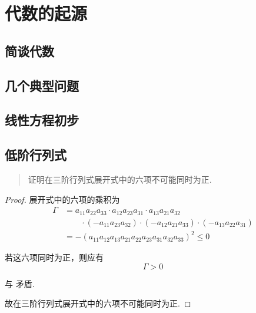 \cleardoublepage

\chapter{代数的起源}

\section{简谈代数}

\section{几个典型问题}

\section{线性方程初步}

\section{低阶行列式}

\begin{quotation}
    证明在三阶行列式展开式中的六项不可能同时为正.
\end{quotation}

\begin{proof}

展开式中的六项的乘积为
\begin{equation}\label{eq:ch01:sec04:prob02}
\begin{aligned}
    \Gamma &= a_{11}a_{22}a_{33}\cdot{}a_{12}a_{23}a_{31}\cdot{a_{13}}a_{21}a_{32} \\
    & \qquad \cdot(-a_{11}a_{23}a_{32})\cdot(-a_{12}a_{21}a_{33})\cdot(-a_{13}a_{22}a_{31}) \\
    &= -(a_{11}a_{12}a_{13}a_{21}a_{22}a_{23}a_{31}a_{32}a_{33})^2 \le 0
\end{aligned}
\end{equation}

若这六项同时为正，则应有
\begin{equation}
    \Gamma > 0
\end{equation}

与 矛盾.

故在三阶行列式展开式中的六项不可能同时为正.

\end{proof}

